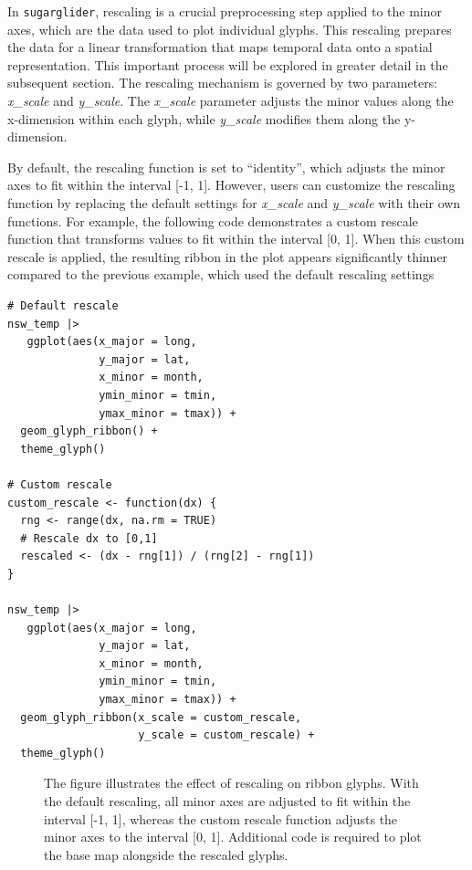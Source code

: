 In \texttt{sugarglider}, rescaling is a crucial preprocessing step applied to the minor axes, which are the data used to plot individual glyphs. This rescaling prepares the data for a linear transformation that maps temporal data onto a spatial representation. This important process will be explored in greater detail in the subsequent section. The rescaling mechanism is governed by two parameters: \emph{x\_scale} and \emph{y\_scale}. The \emph{x\_scale} parameter adjusts the minor values along the x-dimension within each glyph, while \emph{y\_scale} modifies them along the y-dimension.

By default, the rescaling function is set to ``identity'', which adjusts the minor axes to fit within the interval {[}-1, 1{]}. However, users can customize the rescaling function by replacing the default settings for \emph{x\_scale} and \emph{y\_scale} with their own functions. For example, the following code demonstrates a custom rescale function that transforms values to fit within the interval {[}0, 1{]}. When this custom rescale is applied, the resulting ribbon in the plot appears significantly thinner compared to the previous example, which used the default rescaling settings

\begin{verbatim}
# Default rescale 
nsw_temp |>
   ggplot(aes(x_major = long,
              y_major = lat,
              x_minor = month,
              ymin_minor = tmin,
              ymax_minor = tmax)) +
  geom_glyph_ribbon() +
  theme_glyph() 

# Custom rescale 
custom_rescale <- function(dx) {
  rng <- range(dx, na.rm = TRUE)
  # Rescale dx to [0,1]
  rescaled <- (dx - rng[1]) / (rng[2] - rng[1])
}

nsw_temp |>
   ggplot(aes(x_major = long,
              y_major = lat,
              x_minor = month,
              ymin_minor = tmin,
              ymax_minor = tmax)) +
  geom_glyph_ribbon(x_scale = custom_rescale,
                    y_scale = custom_rescale) +
  theme_glyph() 
\end{verbatim}

\begin{figure}
\centering
{}
\caption{\label{fig:defaultRescale}The figure illustrates the effect of rescaling on ribbon glyphs. With the default rescaling, all minor axes are adjusted to fit within the interval {[}-1, 1{]}, whereas the custom rescale function adjusts the minor axes to the interval {[}0, 1{]}. Additional code is required to plot the base map alongside the rescaled glyphs.}
\end{figure}

